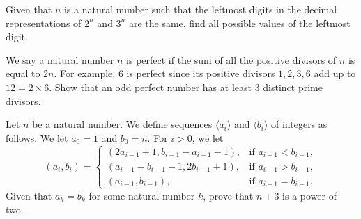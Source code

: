 \documentclass[problems.tex]{subfile}
\begin{document}
	
	
	
	\begin{problem}
		Given that $n$ is a natural number such that the leftmost digits in the decimal representations of $2^n$ and $3^n$ are the same, find all possible values of the leftmost digit. %
	\end{problem}
	
	
	
	
	\begin{problem}
		We say a natural number $n$ is perfect if the sum of all the positive divisors of $n$ is equal to $2n$. For example, $6$ is perfect since its positive divisors $1,2,3,6$ add up to $12=2\times 6$. Show that an odd perfect number has at least $3$ distinct prime divisors. %
	\end{problem}
	
	
	
	
	
	
	
	\begin{problem}
		Let $n$ be a natural number. We define sequences $\langle a_i\rangle$ and $\langle b_i\rangle$ of integers as follows. We let $a_0=1$ and $b_0=n$. For $i>0$, we let $$\left( a_i,b_i\right)=\begin{cases} \left(2a_{i-1}+1,b_{i-1}-a_{i-1}-1\right), & \text{if } a_{i-1}<b_{i-1},\\ \left( a_{i-1}-b_{i-1}-1,2b_{i-1}+1\right), & \text{if } a_{i-1}>b_{i-1},\\ \left(a_{i-1},b_{i-1}\right), & \text{if } a_{i-1}=b_{i-1}.\end{cases}$$ Given that $a_k=b_k$ for some natural number $k$, prove that $n+3$ is a power of two. %
	\end{problem}
	
	
	
\end{document}
